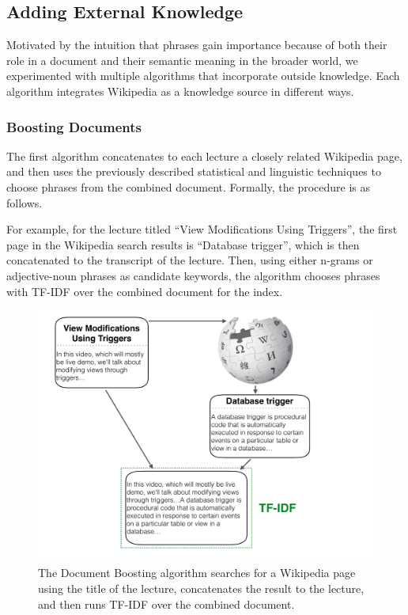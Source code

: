 \subsection{Adding External Knowledge}
\label{sec:wiki}


Motivated by the intuition that phrases gain importance because of both their role in a document and their semantic meaning in the broader world, we experimented with multiple algorithms that incorporate outside knowledge. Each algorithm integrates Wikipedia as a knowledge source in different ways.

\subsubsection{Boosting Documents}

The first algorithm concatenates to each lecture a closely related Wikipedia page,
and then uses the previously described statistical and linguistic techniques
to choose phrases from the combined document. Formally, the procedure is as
follows.

For example, for the lecture titled ``View Modifications Using
Triggers'', the first page in the Wikipedia search results is
``Database trigger'', which is then concatenated to the transcript of
the lecture. Then, using either n-grams or adjective-noun phrases as
candidate keywords, the algorithm chooses phrases with TF-IDF over the
combined document for the index.

\begin{figure}
\caption{The Document Boosting algorithm searches for a Wikipedia page using the title of the lecture, concatenates the result to the lecture, and then runs TF-IDF over the combined document.}
\includegraphics[width=\textwidth]{document_boosting.pdf}
\end{figure}

